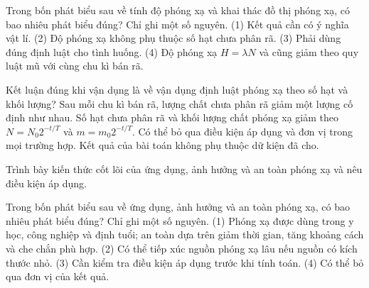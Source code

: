 \begin{ex}
Trong bốn phát biểu sau về tính độ phóng xạ và khai thác đồ thị phóng xạ, có bao nhiêu phát biểu đúng? Chỉ ghi một số nguyên. (1) Kết quả cần có ý nghĩa vật lí. (2) Độ phóng xạ không phụ thuộc số hạt chưa phân rã. (3) Phải dùng đúng định luật cho tình huống. (4) Độ phóng xạ $H=\lambda N$ và cũng giảm theo quy luật mũ với cùng chu kì bán rã.
\end{ex}

\begin{ex}
Kết luận đúng khi vận dụng là về vận dụng định luật phóng xạ theo số hạt và khối lượng?
\choice
{Sau mỗi chu kì bán rã, lượng chất chưa phân rã giảm một lượng cố định như nhau.}
{\True Số hạt chưa phân rã và khối lượng chất phóng xạ giảm theo $N=N_0 2^{-t/T}$ và $m=m_0 2^{-t/T}$.}
{Có thể bỏ qua điều kiện áp dụng và đơn vị trong mọi trường hợp.}
{Kết quả của bài toán không phụ thuộc dữ kiện đã cho.}
\end{ex}

\begin{bt}
Trình bày kiến thức cốt lõi của ứng dụng, ảnh hưởng và an toàn phóng xạ và nêu điều kiện áp dụng.
\end{bt}

\begin{ex}
Trong bốn phát biểu sau về ứng dụng, ảnh hưởng và an toàn phóng xạ, có bao nhiêu phát biểu đúng? Chỉ ghi một số nguyên. (1) Phóng xạ được dùng trong y học, công nghiệp và định tuổi; an toàn dựa trên giảm thời gian, tăng khoảng cách và che chắn phù hợp. (2) Có thể tiếp xúc nguồn phóng xạ lâu nếu nguồn có kích thước nhỏ. (3) Cần kiểm tra điều kiện áp dụng trước khi tính toán. (4) Có thể bỏ qua đơn vị của kết quả.
\end{ex}

